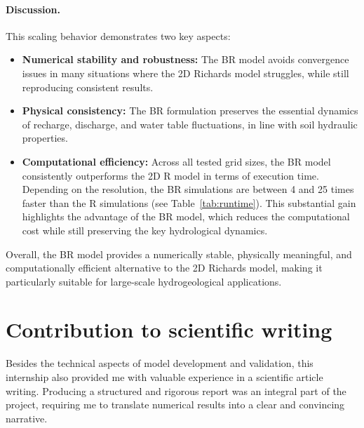 \documentclass[12pt,a4paper]{article}
\begin{document}
\paragraph{Discussion.}
This scaling behavior demonstrates two key aspects:  
\begin{itemize}
    \item \textbf{Numerical stability and robustness:} The BR model avoids convergence issues in many situations where the 2D Richards model struggles, while still reproducing consistent results.  
    \item \textbf{Physical consistency:} The BR formulation preserves the essential dynamics of recharge, discharge, and water table fluctuations, in line with soil hydraulic properties.  
    \item \textbf{Computational efficiency:} Across all tested grid sizes, the BR model consistently outperforms the 2D R model in terms of execution time. Depending on the resolution, the BR simulations are between 4 and 25 times faster than the R simulations (see Table~\ref{tab:runtime}). This substantial gain highlights the advantage of the BR model, which reduces the computational cost while still preserving the key hydrological dynamics.
\end{itemize}

Overall, the BR model provides a numerically stable, physically meaningful, and computationally efficient alternative to the 2D Richards model, making it particularly suitable for large-scale hydrogeological applications.\\



\section{Contribution to scientific writing}

Besides the technical aspects of model development and validation, this internship also provided me with valuable experience in a scientific article writing.  
Producing a structured and rigorous report was an integral part of the project, requiring me to translate numerical results into a clear and convincing narrative. \\ 
\end{document}
